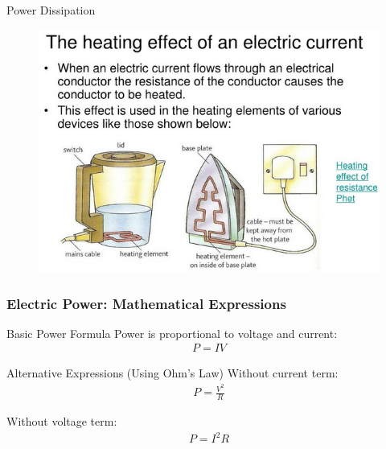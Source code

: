 \documentclass{beamer}
\begin{document}
\begin{frame}
\begin{alertblock}{Power Dissipation}
\begin{figure}
    \centering
    \includegraphics[width=1\linewidth]{phys11-circuits-heating-effect-of-resistance.png}
\end{figure}
\end{alertblock}
\end{frame}

\begin{frame}
\frametitle{Electric Power: Mathematical Expressions}
\begin{block}{Basic Power Formula}
Power is proportional to voltage and current:
\begin{align}
P = IV
\end{align}
\end{block}

\begin{block}{Alternative Expressions (Using Ohm's Law)}
Without current term:
\begin{align}
P = \frac{V^2}{R}
\end{align}

Without voltage term:
\begin{align}
P = I^2R
\end{align}
\end{block}
\end{frame}
\end{document}
